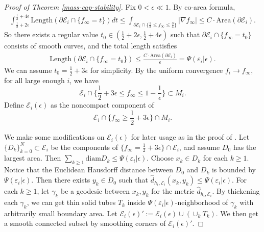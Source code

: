 \documentclass[letter]{amsart}
\theoremstyle{definition}
\theoremstyle{remark}
\def\Area{\mathrm{Area}}
\begin{document}
\begin{proof}[Proof of Theorem \ref{mass-cap-stability}]
Fix $0< \epsilon \ll 1$. By co-area formula,
\begin{align*}
	\int_{\frac{1}{2}+ 2\epsilon }^{\frac{1}{2}+ 4\epsilon } \mathrm{Length}(\partial \mathcal{E}_i \cap \{f_\infty = t\}) dt \leq \int_{\partial \mathcal{E}_i \cap \{\frac{1}{2} \leq f_\infty \leq \frac{3}{4} \} } |\nabla f_\infty| \leq C \cdot \Area(\partial \mathcal{E}_i).
\end{align*}
So there exists a regular value $t_0 \in (\frac{1}{2}+ 2\epsilon , \frac{1}{2}+ 4\epsilon )$ such that $\partial \mathcal{E}_i \cap \{f_\infty = t_0\} $ consists of smooth curves, and the total length satisfies 
\begin{align*}
	\mathrm{Length}(\partial \mathcal{E}_i \cap \{f_\infty = t_0\} ) \leq \frac{C \cdot \Area(\partial \mathcal{E}_i)}{\epsilon } = \Psi (\varepsilon _i| \epsilon ).
\end{align*}
We can assume $t_0 = \frac{1}{2}+ 3\epsilon $ for simplicity. 
By the uniform convergence $f_i \to  f_\infty$, for all large enough $i$, we have
$$
\mathcal{E}_i \cap \{\frac{1}{2}+ 3\epsilon \leq f_\infty \leq 1 - \frac{1}{\epsilon }\} \subset M_i.
$$
Define $\mathcal{E}_i(\epsilon )$ as the noncompact component of  $$ \mathcal{E}_i \cap \{f_\infty \geq \frac{1}{2}+ 3\epsilon \} \cap M_i.$$

We make some modifications on $ \mathcal{E}_i(\epsilon )$ for later usage as in the proof of \cite[Lemma 4.3]{DS'23}. Let $\{D_k\} _{k=0}^{N} \subset \mathcal{E}_i$ be the components of $\{f_\infty= \frac{1}{2}+ 3\epsilon \} \cap \mathcal{E}_i $, and assume $D_0$ has the largest area. Then $ \sum_{k \geq 1}^{} \mathrm{diam}D_k \leq \Psi (\varepsilon _i| \epsilon )$. Choose $x_k \in D_k$ for each $k\geq 1$. Notice that the Euclidean Hausdorff distance between $D_0$ and $D_k$ is bounded by $ \Psi (\varepsilon _i|\epsilon )$. Then there exists $y_k \in D_0$ such that $\hat{d}_{h_i, \mathcal{E}_i}(x_k, y_k) \leq \Psi (\varepsilon _i| \epsilon )$. For each $k \geq 1$, let $\gamma _k$ be a geodesic between $x_k, y_k$ for the metric $\hat{d}_{h_i, \mathcal{E}_i}$. By thickening each $\gamma _k$, we can get thin solid tubes $T_k$ inside $\Psi (\varepsilon _i|\epsilon )$-neighborhood of $\gamma _k$ with arbitrarily small boundary area. Let $\mathcal{E}_i(\epsilon )' := \mathcal{E}_i(\epsilon ) \cup (\cup _k T_k).$ We then get a smooth connected subset by smoothing corners of $\mathcal{E}_i(\epsilon )'$.


\end{proof}
\end{document}
